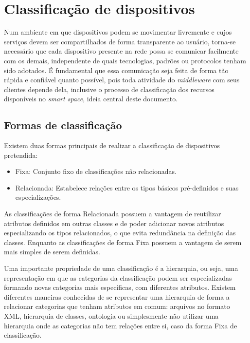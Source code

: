 \chapter{Classificação de dispositivos}

Num ambiente em que dispositivos podem se movimentar livremente e cujos serviços devem ser compartilhados de forma transparente ao usuário, torna-se necessário que cada dispositivo presente na rede possa se comunicar facilmente com os demais, independente de quais tecnologias, padrões ou protocolos tenham sido adotados. É fundamental que essa comunicação seja feita de forma tão rápida e confiável quanto possível, pois toda atividade do \emph{middleware} com seus clientes depende dela, inclusive o processo de classificação dos recursos disponíveis no \emph{smart space}, ideia central deste documento.

\section{Formas de classificação}

Existem duas formas principais de realizar a classificação de dispositivos pretendida:

\begin{itemize}
	\item Fixa:
		Conjunto fixo de classificações não relacionadas.
	\item Relacionada:
		Estabelece relações entre os tipos básicos pré-definidos e suas especializações.

\end{itemize}

As classificações de forma Relacionada possuem a vantagem de reutilizar atributos definidos em outras classes e de poder adicionar novos atributos especializando os tipos relacionados, o que evita redundância na definição das classes. Enquanto as classificações de forma Fixa possuem a vantagem de serem mais simples de serem definidas.

Uma importante propriedade de uma classificação é a hierarquia, ou seja, uma representação em que as categorias da classificação podem ser especializadas formando novas categorias mais específicas, com diferentes atributos. Existem diferentes maneiras conhecidas de se representar uma hierarquia de forma a relacionar categorias que tenham atributos em comum: arquivos no formato XML, hierarquia de classes, ontologia ou simplesmente não utilizar uma hierarquia onde as categorias não tem relações entre si, caso da forma Fixa de classificação.

